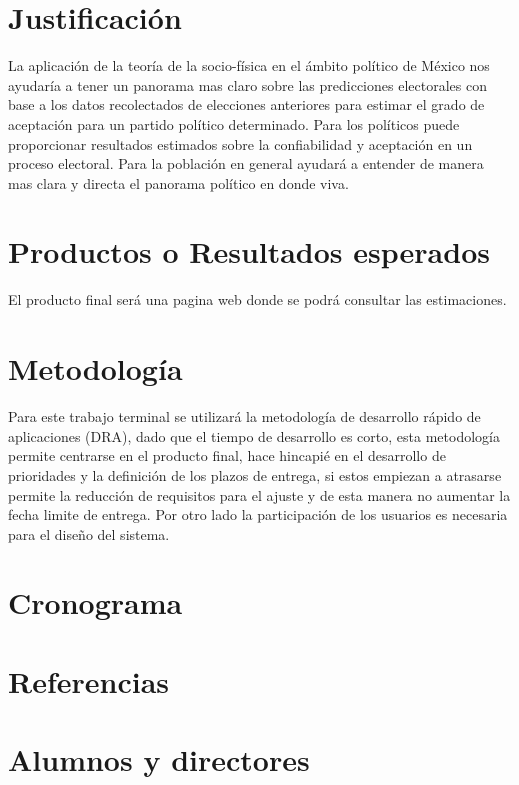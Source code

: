 \documentclass[letterpaper, 10pt]{article}
\begin{document}
\section{Justificación}

La aplicación de la teoría de la socio-física en el ámbito político de México nos ayudaría a tener un panorama mas claro sobre las predicciones electorales con base a los datos recolectados de elecciones anteriores para estimar el grado de aceptación para un partido político determinado.
\newline
\newline
Para los políticos puede proporcionar resultados estimados sobre la confiabilidad y aceptación en un proceso electoral. Para la población en general ayudará a entender de manera mas clara y directa el panorama político en donde viva.

\section{Productos o Resultados esperados}
El producto final será una pagina web donde se podrá consultar las estimaciones.

\section{Metodología}

Para este trabajo terminal se utilizará la metodología de desarrollo rápido de aplicaciones (DRA), dado que el tiempo de desarrollo es corto, esta metodología permite centrarse en el producto final, hace hincapié en el desarrollo de prioridades y la definición de los plazos de entrega, si estos empiezan a atrasarse permite la reducción de requisitos para el ajuste y de esta manera no aumentar la fecha limite de entrega. Por otro lado la participación de los usuarios es necesaria para el diseño del sistema.

\section{Cronograma}

\newpage
\section{Referencias}
\printbibliography[heading=none] %
\section{Alumnos y directores}
\end{document}
